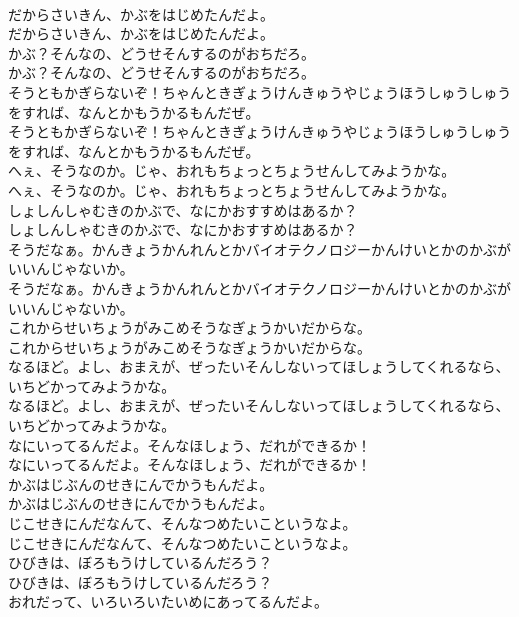 \documentclass[8pt]{extreport}
\begin{document}
\begin{CJK}{UTF8}{min}
\\	だからさいきん、かぶをはじめたんだよ。	
\\	だからさいきん、かぶをはじめたんだよ。 
\\	かぶ？そんなの、どうせそんするのがおちだろ。	
\\	かぶ？そんなの、どうせそんするのがおちだろ。 
\\	そうともかぎらないぞ！ちゃんときぎょうけんきゅうやじょうほうしゅうしゅうをすれば、なんとかもうかるもんだぜ。	
\\	そうともかぎらないぞ！ちゃんときぎょうけんきゅうやじょうほうしゅうしゅうをすれば、なんとかもうかるもんだぜ。 
\\	へぇ、そうなのか。じゃ、おれもちょっとちょうせんしてみようかな。	
\\	へぇ、そうなのか。じゃ、おれもちょっとちょうせんしてみようかな。 
\\	しょしんしゃむきのかぶで、なにかおすすめはあるか？	
\\	しょしんしゃむきのかぶで、なにかおすすめはあるか？ 
\\	そうだなぁ。かんきょうかんれんとかバイオテクノロジーかんけいとかのかぶがいいんじゃないか。	
\\	そうだなぁ。かんきょうかんれんとかバイオテクノロジーかんけいとかのかぶがいいんじゃないか。 
\\	これからせいちょうがみこめそうなぎょうかいだからな。	
\\	これからせいちょうがみこめそうなぎょうかいだからな。 
\\	なるほど。よし、おまえが、ぜったいそんしないってほしょうしてくれるなら、いちどかってみようかな。	
\\	なるほど。よし、おまえが、ぜったいそんしないってほしょうしてくれるなら、いちどかってみようかな。 
\\	なにいってるんだよ。そんなほしょう、だれができるか！	
\\	なにいってるんだよ。そんなほしょう、だれができるか！ 
\\	かぶはじぶんのせきにんでかうもんだよ。	
\\	かぶはじぶんのせきにんでかうもんだよ。 
\\	じこせきにんだなんて、そんなつめたいこというなよ。	
\\	じこせきにんだなんて、そんなつめたいこというなよ。 
\\	ひびきは、ぼろもうけしているんだろう？	
\\	ひびきは、ぼろもうけしているんだろう？ 
\\	おれだって、いろいろいたいめにあってるんだよ。	

\end{CJK}
\end{document}
